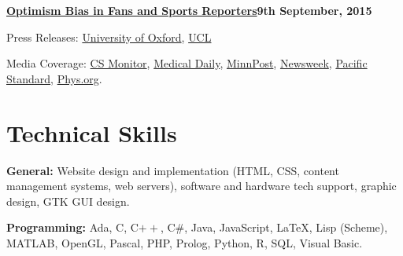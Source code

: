 \blankline

\href{http://journals.plos.org/plosone/article?id=10.1371/journal.pone.0137685}{\textbf{Optimism Bias in Fans and Sports Reporters}}\hfill\textbf{9th September, 2015}


\begin{outerlist}

\item Press Releases: \href{http://www.ox.ac.uk/news/2015-09-09-nfl-fans-and-espn-reporters-overly-optimistic-about-team-prospects}{University of Oxford}, \href{https://www.ucl.ac.uk/news/news-articles/0915/100915-nfl-team-prospects}{UCL}

\item Media Coverage: \href{http://www.csmonitor.com/Science/2015/0909/NFL-scores-Your-team-is-probably-less-invincible-than-you-imagine}{CS Monitor},
\href{http://www.medicaldaily.com/rose-colored-glasses-nfl-fans-and-sports-reporters-overestimate-how-good-their-teams-351888}{Medical Daily},
\href{https://www.minnpost.com/second-opinion/2015/09/why-football-fans-are-unrealistically-optimistic-and-why-it-matters}{MinnPost},
\href{http://europe.newsweek.com/nfl-fans-and-reporters-overly-optimistic-about-teams-prospects-332758}{Newsweek},
\href{http://www.psmag.com/health-and-behavior/this-study-explains-why-raiders-fans-continue-going-to-watch-their-team-play}{Pacific Standard},
\href{http://phys.org/news/2015-09-nfl-fans-espn-overly-optimistic.html}{Phys.org}. 


\end{outerlist}


\section{Technical Skills}


\textbf{General:} Website design and implementation (HTML, CSS, content management systems, web servers), software and hardware tech support, graphic design, GTK GUI design.

\blankline


\textbf{Programming:} Ada, C, C$++$, C\#, Java, JavaScript,  \LaTeX, Lisp (Scheme), MATLAB,  OpenGL, Pascal, PHP, Prolog, Python, R, SQL, Visual Basic.

% 


% 


